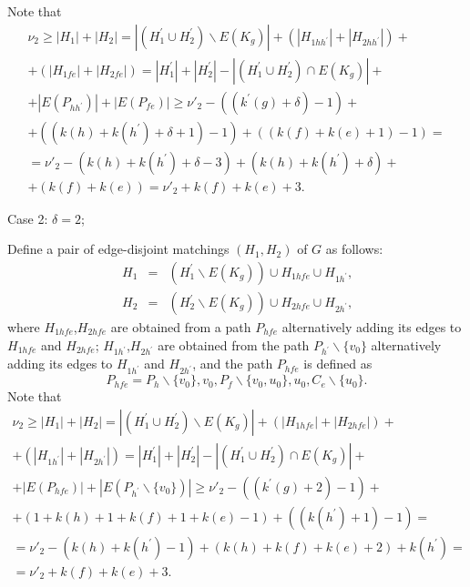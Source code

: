 \documentclass[fleqn,12pt,twoside]{article}
\newenvironment{proof}[1][Proof.]{\begin{trivlist}
\item[\hskip \labelsep {\bfseries #1}]}{\end{trivlist}}
\begin{document}
\begin{proof}
Note that
\begin{gather*}
\nu _{2}\geq \left\vert H_{1}\right\vert +\left\vert
H_{2}\right\vert =\left\vert (H_{1}^{\prime }\cup H_{2}^{\prime
})\backslash E(K_{g})\right\vert +(\left\vert H_{1hh^{\prime
}}\right\vert +\left\vert
H_{2hh^{\prime }}\right\vert )+ \\
+(\left\vert H_{1fe}\right\vert +\left\vert H_{2fe}\right\vert
)=\left\vert H_{1}^{\prime }\right\vert +\left\vert H_{2}^{\prime
}\right\vert -\left\vert (H_{1}^{\prime }\cup H_{2}^{\prime })\cap
E(K_{g})\right\vert +
\\
+\left\vert E(P_{hh^{\prime }})\right\vert +\left\vert
E(P_{fe})\right\vert \geq \nu' _{2}-((k^{\prime }(g)+\delta
)-1)+ \\
+((k(h)+k(h^{\prime })+\delta +1)-1)+((k(f)+k(e)+1)-1)= \\
=\nu' _{2}-(k(h)+k(h^{\prime })+\delta -3)+(k(h)+k(h^{\prime
})+\delta )+ \\
+(k(f)+k(e))=\nu' _{2}+k(f)+k(e)+3\text{.}
\end{gather*}

Case 2: $\delta =2$;

Define a pair of edge-disjoint matchings $\left( H_{1},H_{2}\right)
$ of $G$ as follows:
\begin{eqnarray*}
H_{1} &=&(H_{1}^{\prime }\backslash E(K_{g}))\cup H_{1hfe}\cup
H_{1h^{\prime
}}\text{,} \\
H_{2} &=&(H_{2}^{\prime }\backslash E(K_{g}))\cup H_{2hfe}\cup
H_{2h^{\prime }}\text{,}
\end{eqnarray*}where $H_{1hfe}$,$H_{2hfe}$ are obtained from a path $P_{hfe}$
alternatively
adding its edges to $H_{1hfe}$ and $H_{2hfe}$; $H_{1h^{\prime }}$,$H_{2h^{\prime }}$ are obtained from the path $P_{h^{\prime
}}\backslash
\{v_{0}\}$ alternatively adding its edges to $H_{1h^{\prime }}$ and $H_{2h^{\prime }}$, and the path $P_{hfe}$ is defined as
\begin{equation*}
P_{hfe}=P_{h}\backslash \{v_{0}\},v_{0},P_{f}\backslash
\{v_{0},u_{0}\},u_{0},C_{e}\backslash \{u_{0}\}\text{.}
\end{equation*}Note that\begin{gather*}
\nu _{2}\geq \left\vert H_{1}\right\vert +\left\vert
H_{2}\right\vert =\left\vert (H_{1}^{\prime }\cup H_{2}^{\prime
})\backslash E(K_{g})\right\vert +(\left\vert H_{1hfe}\right\vert
+\left\vert
H_{2hfe}\right\vert )+ \\
+(\left\vert H_{1h^{\prime }}\right\vert +\left\vert H_{2h^{\prime
}}\right\vert )=\left\vert H_{1}^{\prime }\right\vert +\left\vert
H_{2}^{\prime }\right\vert -\left\vert (H_{1}^{\prime }\cup
H_{2}^{\prime
})\cap E(K_{g})\right\vert + \\
+\left\vert E(P_{hfe})\right\vert +\left\vert E(P_{h^{\prime
}}\backslash
\{v_{0}\})\right\vert \geq \nu' _{2}-((k^{\prime }(g)+2)-1)+ \\
+(1+k(h)+1+k(f)+1+k(e)-1)+((k(h^{\prime })+1)-1)= \\
=\nu' _{2}-(k(h)+k(h^{\prime
})-1)+(k(h)+k(f)+k(e)+2)+k(h^{\prime })= \\
=\nu' _{2}+k(f)+k(e)+3\text{.}
\end{gather*}


\end{proof}
\end{document}
